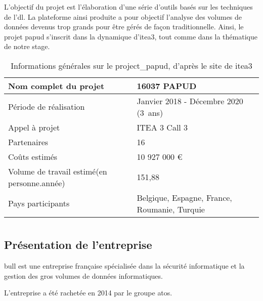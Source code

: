 L'objectif du projet  est l'élaboration d'une série d'outils basés sur les techniques de l'\gls{dl}.
La plateforme ainsi produite a pour objectif l'analyse des volumes de données devenus trop grands pour être gérés de façon traditionnelle.
Ainsi, le projet \gls{papud} s'inscrit dans la dynamique d'\gls{itea3}, tout comme dans la thématique de notre stage.

\begin{table}[h]{
	\centering
	\renewcommand{\arraystretch}{1.5}
	\setlength\tabcolsep{1em}
	\begin{tabularx}{\textwidth}{|X|l|}
		\hline
		Nom complet du projet & 16037 PAPUD\\
		\hline
		Période de réalisation & Janvier 2018 - Décembre 2020 (3~ans)\\
		\hline
		Appel à projet & ITEA 3 Call 3\\
		\hline
		Partenaires & 16\\
		\hline
		Coûts estimés & 10 927 000 €\\
		\hline
		Volume de travail estimé\newline (en personne.année) & 151,88 \\
		\hline
		Pays participants & Belgique, Espagne, France, \mbox{Roumanie}, Turquie\\
		\hline
	\end{tabularx}
	\renewcommand{\arraystretch}{1}}
	\caption[Informations générales sur le \gls{project_papud}, d'après le site de \gls{itea3}]{Informations générales sur le \gls{project_papud}, d'après le site de \gls{itea3} \autocite{about_papud} \label{tab:about_papud}}
\end{table}

\section{}
\subsection*{Présentation de l'entreprise}
\gls{bull} est une entreprise française spécialisée dans la sécurité informatique et la gestion des gros volumes de données informatiques. 

L'entreprise a été rachetée en 2014 par le groupe \gls{atos}.

